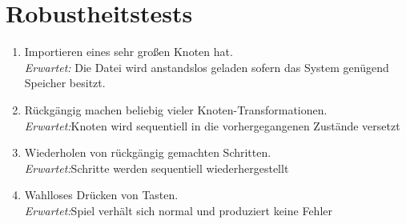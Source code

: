 \section{Robustheitstests}


\begin{enumerate}[resume]
\item Importieren eines sehr großen Knoten hat.\\
\textit{Erwartet:} Die Datei wird anstandslos geladen sofern das System genügend Speicher besitzt.
\item Rückgängig machen beliebig vieler Knoten-Transformationen. \\
\textit{Erwartet:}Knoten wird sequentiell in die vorhergegangenen Zustände versetzt
\item Wiederholen von rückgängig gemachten Schritten.\\
\textit{Erwartet:}Schritte werden sequentiell wiederhergestellt

\item Wahlloses Drücken von Tasten.\\
\textit{Erwartet:}Spiel verhält sich normal und produziert keine Fehler
\end{enumerate}



